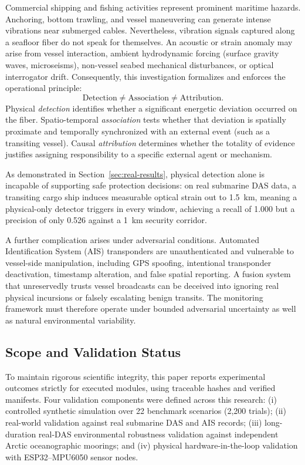 \documentclass[conference]{IEEEtran}
\begin{document}
Commercial shipping and fishing activities represent prominent maritime
hazards. Anchoring, bottom trawling, and vessel maneuvering can generate intense
vibrations near submerged cables. Nevertheless, vibration signals captured along
a seafloor fiber do not speak for themselves. An acoustic or strain anomaly may
arise from vessel interaction, ambient hydrodynamic forcing (surface gravity
waves, microseisms), non-vessel seabed mechanical disturbances, or optical
interrogator drift. Consequently, this investigation formalizes and enforces
the operational principle:
\begin{equation}
\text{Detection} \neq \text{Association} \neq \text{Attribution}.
\label{eq:principle}
\end{equation}
Physical \emph{detection} identifies whether a significant energetic deviation
occurred on the fiber. Spatio-temporal \emph{association} tests whether that
deviation is spatially proximate and temporally synchronized with an external
event (such as a transiting vessel). Causal \emph{attribution} determines
whether the totality of evidence justifies assigning responsibility to a
specific external agent or mechanism.

As demonstrated in Section~\ref{sec:real-results}, physical detection alone is
incapable of supporting safe protection decisions: on real submarine DAS data, a
transiting cargo ship induces measurable optical strain out to 1.5~km, meaning a
physical-only detector triggers in every window, achieving a recall of 1.000 but
a precision of only 0.526 against a 1~km security corridor.

A further complication arises under adversarial conditions. Automated
Identification System (AIS) transponders are unauthenticated and vulnerable to
vessel-side manipulation, including GPS spoofing, intentional transponder
deactivation, timestamp alteration, and false spatial reporting. A fusion
system that unreservedly trusts vessel broadcasts can be deceived into
ignoring real physical incursions or falsely escalating benign transits.
The monitoring framework must therefore operate under bounded adversarial
uncertainty as well as natural environmental variability.

\subsection{Scope and Validation Status}
\label{sec:scope-detail}

To maintain rigorous scientific integrity, this paper reports experimental
outcomes strictly for executed modules, using traceable hashes and verified
manifests. Four validation components were defined across this research:
(i) controlled synthetic simulation over 22 benchmark scenarios (2,200 trials);
(ii) real-world validation against real submarine DAS and AIS records;
(iii) long-duration real-DAS environmental robustness validation against
independent Arctic oceanographic moorings; and (iv) physical hardware-in-the-loop
validation with ESP32--MPU6050 sensor nodes.
\end{document}

